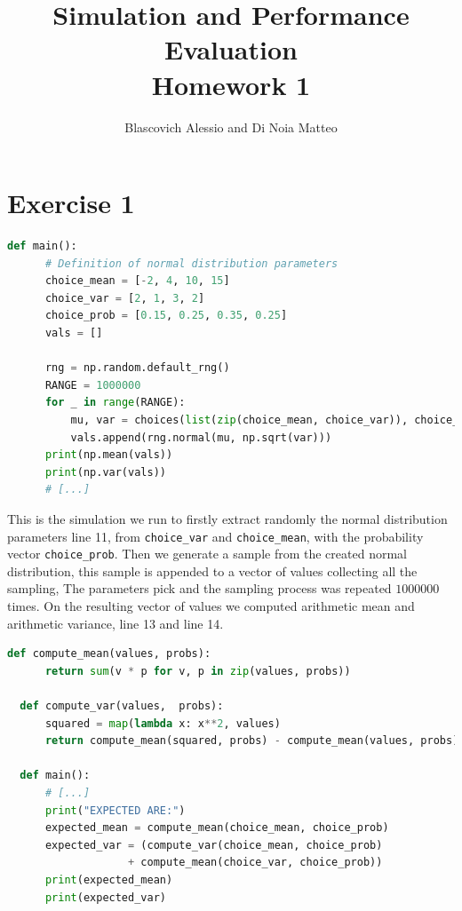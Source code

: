 \documentclass[10pt,a4paper]{article}
\title{
  {\Huge Simulation and Performance Evaluation}\\
  \huge Homework 1 \\
}
\author{Blascovich Alessio and Di Noia Matteo}
\begin{document}
\maketitle

\section*{Exercise 1}

\begin{center}
  \begin{lstlisting}[language=python]
  def main():
      # Definition of normal distribution parameters
      choice_mean = [-2, 4, 10, 15]
      choice_var = [2, 1, 3, 2]
      choice_prob = [0.15, 0.25, 0.35, 0.25]
      vals = []
      
      rng = np.random.default_rng()
      RANGE = 1000000
      for _ in range(RANGE):
          mu, var = choices(list(zip(choice_mean, choice_var)), choice_prob)[0]
          vals.append(rng.normal(mu, np.sqrt(var)))
      print(np.mean(vals))
      print(np.var(vals))
      # [...]
  \end{lstlisting}
\end{center}

This is the simulation we run to firstly extract randomly the normal distribution parameters line 11, from \texttt{choice\_var} and \texttt{choice\_mean}, with the probability vector \texttt{choice\_prob}. Then we generate a sample from the created normal distribution, this sample is appended to a vector of values collecting all the sampling, The parameters pick and the sampling process was repeated \(1000000\) times. On the resulting vector of values we computed arithmetic mean and arithmetic variance, line 13 and line 14. 

\begin{center}
  \begin{lstlisting}[language=python]
  def compute_mean(values, probs):
      return sum(v * p for v, p in zip(values, probs))
    
  def compute_var(values,  probs):
      squared = map(lambda x: x**2, values)
      return compute_mean(squared, probs) - compute_mean(values, probs)**2
  
  def main():
      # [...]
      print("EXPECTED ARE:")
      expected_mean = compute_mean(choice_mean, choice_prob)
      expected_var = (compute_var(choice_mean, choice_prob)
                   + compute_mean(choice_var, choice_prob))
      print(expected_mean)
      print(expected_var)
  \end{lstlisting}
\end{center}
\end{document}
